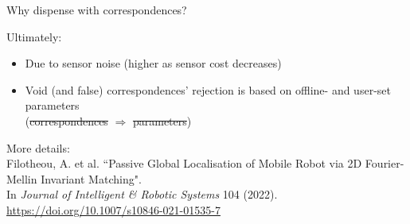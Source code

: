 \begin{frame}[noframenumbering]{Why dispense with correspondences?}

  Ultimately:
  \begin{itemize}
    \item Due to sensor noise (higher as sensor cost decreases)
    \item Void (and false) correspondences' rejection is based on offline- and user-set parameters \\
          (\sout{correspondences} $\Rightarrow$ \sout{parameters})
  \end{itemize}

  \vfill
  {\tiny
  More details: \\
  Filotheou, A. et al. ``Passive Global Localisation of Mobile Robot via 2D
  Fourier-Mellin Invariant Matching". \\ \vspace{-0.25cm}
  In \textit{Journal of Intelligent \& Robotic Systems} 104 (2022). \url{https://doi.org/10.1007/s10846-021-01535-7}}

\end{frame}
